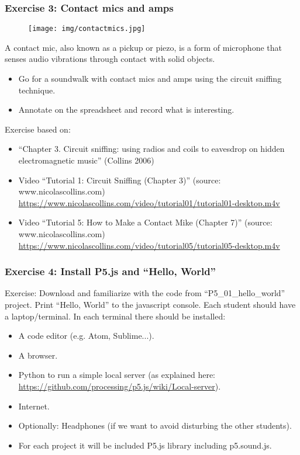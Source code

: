 \documentclass[screen, aspectratio=43]{beamer}
\begin{document}
%
\begin{frame}
  \frametitle{Exercise 3: Contact mics and amps}
 \begin{figure}
	\texttt{[image: img/contactmics.jpg]}
\end{figure}  

  {\scriptsize 
  A contact mic, also known as a pickup or piezo, is a form of microphone that senses audio vibrations through contact with solid objects.
  \begin{itemize}
    \item Go for a soundwalk with contact mics and amps using the circuit sniffing technique.    
    \item Annotate on the spreadsheet and record what is interesting.
  \end{itemize}
  }
  {\tiny Exercise based on:	  
    \begin{itemize}
	\item ``Chapter 3. Circuit sniffing: using radios and coils to eavesdrop on hidden electromagnetic music'' (Collins 2006)
	\item Video ``Tutorial 1: Circuit Sniffing (Chapter 3)'' (source: www.nicolascollins.com)\\ 
	\url{https://www.nicolascollins.com/video/tutorial01/tutorial01-desktop.m4v}
	\item Video ``Tutorial 5: How to Make a Contact Mike (Chapter 7)'' (source: www.nicolascollins.com)\\
	\url{https://www.nicolascollins.com/video/tutorial05/tutorial05-desktop.m4v}
    \end{itemize}
   } 
\end{frame}
%
\begin{frame}
  \frametitle{Exercise 4: Install P5.js and ``Hello, World''}
 Exercise: Download and familiarize with the code from ``P5\_01\_hello\_world'' project. Print ``Hello, World'' to the javascript console.
 Each student should have a laptop/terminal. In each terminal there should be installed:
    \begin{itemize}
	\item A code editor (e.g. Atom, Sublime...).
	\item A browser.
	\item Python to run a simple local server (as explained here: \url{https://github.com/processing/p5.js/wiki/Local-server}). 
	\item Internet.
	\item Optionally: Headphones (if we want to avoid disturbing the other students).
	\item For each project it will be included P5.js library including p5.sound.js.
    \end{itemize}
\end{frame}
\end{document}
